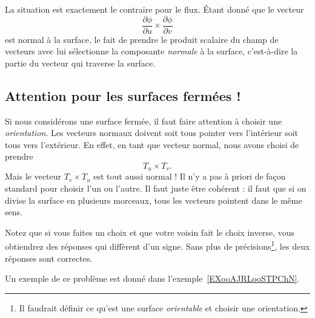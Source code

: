 La situation est exactement le contraire pour le flux. Étant donné que le vecteur
\begin{equation}
	\frac{ \partial \phi }{ \partial u }\times\frac{ \partial \phi }{ \partial v }
\end{equation}
est normal à la surface, le fait de prendre le produit scalaire du champ de vecteurs avec lui sélectionne la composante \emph{normale} à la surface, c'est-à-dire la partie du vecteur qui traverse la surface.

\subsection{Attention pour les surfaces fermées !}

Si nous considérons une surface fermée, il faut faire attention à choisir une \emph{orientation}. Les vecteurs normaux doivent soit tous pointer vers l'intérieur soit tous vers l'extérieur. En effet, en tant que vecteur normal, nous avons choisi de prendre
\begin{equation}
	T_u\times T_v.
\end{equation}
Mais le vecteur \( T_v\times T_u\) est tout aussi normal ! Il n'y a pas à priori de façon standard pour choisir l'un ou l'autre. Il faut juste être cohérent : il faut que si on divise la surface en plusieurs morceaux, tous les vecteurs pointent dans le même sens.

Notez que si vous faites un choix et que votre voisin fait le choix inverse, vous obtiendrez des réponses qui diffèrent d'un signe. Sans plus de précisions\footnote{Il faudrait définir ce qu'est une surface \emph{orientable} et choisir une orientation.}, les deux réponses sont correctes.

Un exemple de ce problème est donné dans l'exemple~\ref{EXooAJRLooSTPChN}.

